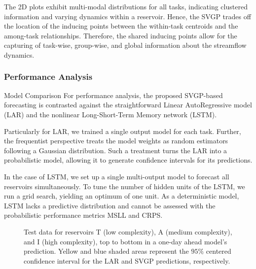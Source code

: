 \begin{frame}
	The 2D plots exhibit multi-modal distributions for all tasks, indicating clustered information and varying dynamics within a reservoir. Hence, the SVGP trades off the location of the inducing points between the within-task centroids and the among-task relationships. Therefore, the shared inducing points allow for the capturing of task-wise, group-wise, and global information about the streamflow dynamics.

\end{frame}

\subsubsection{Performance Analysis}

\begin{frame}{Model Comparison}
	For performance analysis, the proposed SVGP-based forecasting is contrasted against the straightforward Linear AutoRegressive model (LAR) and the nonlinear Long-Short-Term Memory network (LSTM).
	
	Particularly for LAR, we trained a single output model for each task. Further, the frequentist perspective treats the model weights as random estimators following a Gaussian distribution. Such a treatment turns the LAR into a probabilistic model, allowing it to generate confidence intervals for its predictions.
	
	In the case of LSTM, we set up a single multi-output model to forecast all reservoirs simultaneously. To tune the number of hidden units of the LSTM, we run a grid search, yielding an optimum of one unit. As a deterministic model, LSTM lacks a predictive distribution and cannot be assessed with the probabilistic performance metrics MSLL and CRPS.
\end{frame}


\begin{frame}
	\begin{figure}[htbp]
		\centering
		\setlength\figurewidth{\columnwidth} 
		\setlength{}
		
		\hfill
		\hfill
		
		
		\caption{Test data for reservoirs T (low complexity), A (medium complexity), and I (high complexity), top to bottom in a one-day ahead model's prediction. Yellow and blue shaded areas represent the $95\%$ centered confidence interval for the LAR and SVGP predictions, respectively.}
	\end{figure}
\end{frame}



